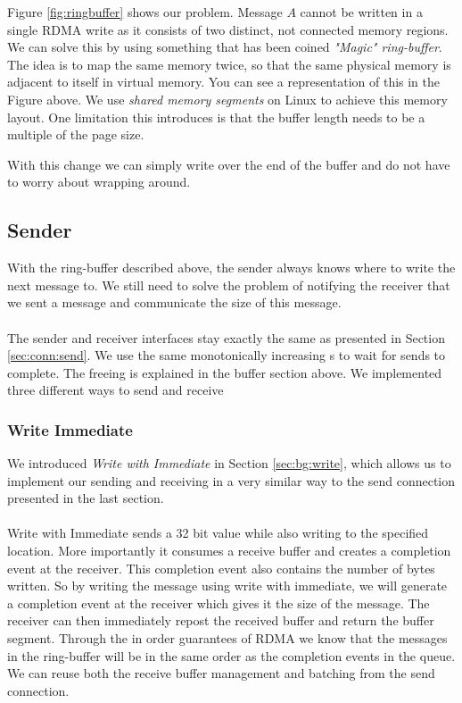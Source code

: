 Figure \ref{fig:ringbuffer} shows our problem. Message $A$ cannot be written in a single RDMA write as it consists of 
two distinct, not connected memory regions. We can solve this by using something that has been coined 
\emph{"Magic" ring-buffer}. The idea is to map the same memory twice, so that the same physical memory is adjacent to itself
in virtual memory. You can see a representation of this in the Figure above. We use \emph{shared memory segments} on 
Linux to achieve this memory layout. One limitation this introduces is that the buffer length needs to be a multiple of the
page size.

With this change we can simply write over the end of the buffer and do not have to worry about wrapping around.




\subsection{Sender} \label{sec:conn:write:sender}

With the ring-buffer described above, the sender always knows where to write the next message to. We still need to solve
the problem of notifying the receiver that we sent a message and communicate the size of this message.

\paragraph{}The sender and receiver interfaces stay exactly the same as presented in Section \ref{sec:conn:send}. We use the same 
monotonically increasing s to wait for sends to complete. The freeing is explained in the buffer section
above. We implemented three different ways to send and receive


\subsubsection{Write Immediate}

We introduced \emph{Write with Immediate} in Section \ref{sec:bg:write}, which  allows us to implement our sending 
and receiving in a very similar way to the send connection presented in the last section.

\paragraph{} Write with Immediate sends a 32 bit value while also writing to the specified location. More importantly it 
consumes a receive buffer and creates a completion event at the receiver. This completion event also contains the number 
of bytes written. So by writing the message using write with immediate, we will generate a completion event at the receiver
which gives it the size of the message. The receiver can then immediately repost the received buffer and return the buffer
segment. Through the in order guarantees of RDMA we know that the messages in the ring-buffer will be in the same
order as the completion events in the queue. We can reuse both the receive buffer management and batching from the send 
connection.


